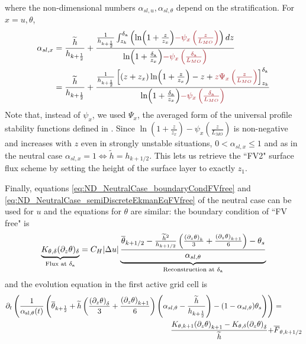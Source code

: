 where the non-dimensional numbers $\alpha_{sl, u},
\alpha_{sl, \theta}$ depend on the stratification. For $x=u, \theta$,
\begin{equation}
	\begin{aligned}
	\alpha_{sl, x} &= \frac{\widetilde{h}}{h_{k+\frac{1}{2}}} +
	\frac{\frac{1}{h_{k+\frac{1}{2}}}\int_{z_k}^{\delta_{\rm a}}
		\left(\ln(1+\frac{z}{z_{x}})
		\emphase{- \psi_x\left(\frac{z}{L_{MO}}\right)}\right)
	dz}{\ln(1+\frac{\delta_{\rm a}}{z_{x}})
		\emphase{- \psi_x\left(\frac{\delta_{\rm a}}{L_{MO}}\right)
		}} \\
		&=\frac{\widetilde{h}}{h_{k+\frac{1}{2}}} +
 \frac{\frac{1}{{h_{k+\frac{1}{2}}}}
    \left[
	    (z+z_{x})\ln(1+\frac{z}{z_{x}})-z
		+\emphase{ z \Psi_x\left(\frac{z}{L_{MO}}\right)}
	\right]_{z_k}^{\delta_{\rm a}}
    }{\ln(1+\frac{\delta_{\rm a}}{z_{x}})
		\emphase{- \psi_x\left(\frac{\delta_{\rm a}}{L_{MO}}\right)
		}}
\end{aligned}
\end{equation}
Note that, instead of $\psi_x$, we used $\Psi_x$,
the averaged form of the universal
profile stability functions defined in \citep{nishizawa_surface_2018}.
%
Since $\ln(1+\frac{z}{z_{x}})-
\psi_x(\frac{z}{L_{MO}})$ is non-negative and increases with $z$ even
in strongly unstable situations,
$0 < \alpha_{sl, x} \leq 1$ and as in the neutral case
$\alpha_{sl, x}=1 \iff \widetilde{h}=h_{k+1/2}$. This lets us retrieve
the ``FV2" surface flux scheme by setting the height of the surface
layer to exactly $z_1$.
\par
Finally, equations \eqref{eq:ND_NeutralCase_boundaryCondFVfree} and
\eqref{eq:ND_NeutralCase_semiDiscreteEkmanEqFVfree} of the
neutral case can be used for
$u$ and the equations for $\theta$ are similar:
the boundary condition of ``FV free" is
\begin{equation}
	\label{eq:ND_StratifiedCase_semiDiscreteEkmanEqFVfree}
	\underbrace{K_{\theta, \delta} (\partial_z \theta)_\delta}_{
		\text{Flux at } \delta_{\rm a}
	} = 
	C_H|\Delta u|\underbrace{
	\frac{
  \overline{\theta}_{k+1/2} - \frac{\widetilde{h}^2}{h_{k+1/2}}
	\left(\frac{{(\partial_z \theta)}_k}{3} +
	\frac{{(\partial_z \theta)}_{k+1}}{6}\right) 
  - \theta_s
}{\alpha_{sl, \theta}}
	}_{\text{Reconstruction at } \delta_{\rm a}}
\end{equation}
and the evolution equation in the first active grid cell is
\begin{equation}
    \begin{aligned}
	\label{eq:ND_StratifiedCase_semiDiscreteEkmanEqPTFVfree}
	    \partial_t \left(\frac{1}{\alpha_{\rm sl, \theta}(t)}
	    \left(
	    \overline{\theta}_{k+\frac{1}{2}} +
	\widetilde{h}\left(\frac{{(\partial_z \theta)}_\delta}{3} +
	\frac{{(\partial_z \theta)}_{k+1}}{6}\right)
		\left(\alpha_{sl, \theta} -
	    	\frac{\widetilde{h}}{h_{k+\frac{1}{2}}}\right)
	 - (1 - \alpha_{sl, \theta})\theta_s
	    \right) \right)&
	= \\
	    \frac{K_{\theta, k+1}{(\partial_z \theta)}_{k+1} -
	K_{\theta,\delta} {(\partial_z \theta)}_\delta}{\widetilde{h}}
	    + &\overline{F}_{\theta, k+1/2}
    \end{aligned}
\end{equation}
